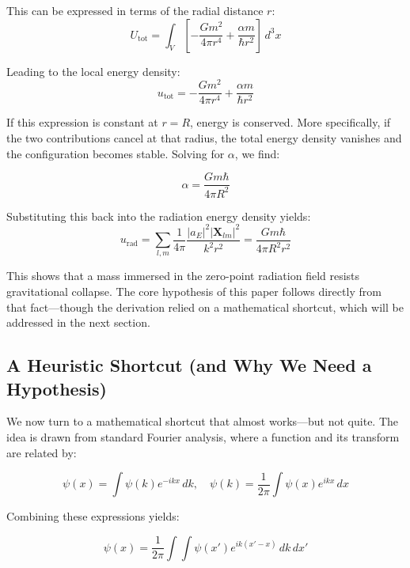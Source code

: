 \documentclass {article}
\renewcommand\vec{\mathbf}
\begin{document}
This can be expressed in terms of the radial distance \(r\):
\begin{equation}
U_{\text{tot}} = \int_V \left[ -\frac{Gm^2}{4\pi r^4} + \frac{\alpha m}{\hbar r^2} \right] \, d^3x
\end{equation}

Leading to the local energy density:
\begin{equation}
u_{\text{tot}} = -\frac{Gm^2}{4\pi r^4} + \frac{\alpha m}{\hbar r^2}
\end{equation}

If this expression is constant at \(r = R\), energy is conserved. More specifically, if the two contributions cancel at that radius, the total energy density vanishes and the configuration becomes stable. Solving for \(\alpha\), we find:

\begin{equation}
\alpha = \frac{Gm\hbar}{4\pi R^2}
\end{equation}

Substituting this back into the radiation energy density yields:
\begin{equation}
u_{\text{rad}} = \sum_{l, m} \frac{1}{4\pi} \frac{|a_E|^2 |\vec{X}_{lm}|^2}{k^2 r^2} = \frac{Gm\hbar}{4\pi R^2 r^2}
\end{equation}

This shows that a mass immersed in the zero-point radiation field resists gravitational collapse. The core hypothesis of this paper follows directly from that fact—though the derivation relied on a mathematical shortcut, which will be addressed in the next section.

\subsection{A Heuristic Shortcut (and Why We Need a Hypothesis)}

We now turn to a mathematical shortcut that almost works—but not quite. The idea is drawn from standard Fourier analysis, where a function and its transform are related by:

\begin{equation}
\psi(x) = \int \psi(k) e^{-ikx} \, dk, \quad
\psi(k) = \frac{1}{2\pi} \int \psi(x) e^{ikx} \, dx
\end{equation}

Combining these expressions yields:

\begin{equation}
\psi(x) = \frac{1}{2\pi} \int \int \psi(x') e^{ik(x' - x)} \, dk \, dx'
\end{equation}
\end{document}
